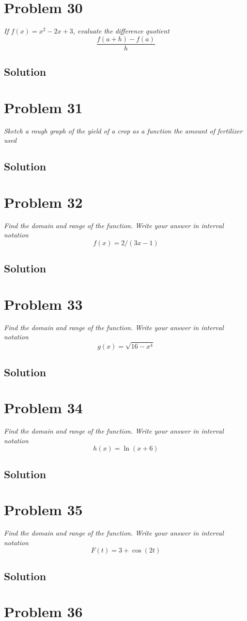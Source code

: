 \documentclass[11pt]{article}
\newcommand{\soln}{\subsection*}
\newcommand{\qn}{\textit}
\begin{document}
\section*{Problem 30}

\qn{If $f(x)=x^2-2x+3$, evaluate the difference quotient $$\frac{f(a+h)-f(a)}{h}$$}
\soln{Solution}

\section*{Problem 31}

\qn{Sketch a rough graph of the yield of a crop as a function the amount of fertilizer used}
\soln{Solution}

\section*{Problem 32}

\qn{Find the domain and range of the function. Write your answer in interval notation $$f(x)=2/(3x-1)$$}
\soln{Solution}

\section*{Problem 33}

\qn{Find the domain and range of the function. Write your answer in interval notation $$g(x)=\sqrt{16-x^4}$$}
\soln{Solution}

\section*{Problem 34}

\qn{Find the domain and range of the function. Write your answer in interval notation $$h(x)=\ln(x+6)$$}
\soln{Solution}

\section*{Problem 35}

\qn{Find the domain and range of the function. Write your answer in interval notation $$F(t)=3+\cos(2t)$$}
\soln{Solution}

\section*{Problem 36}
\end{document}
